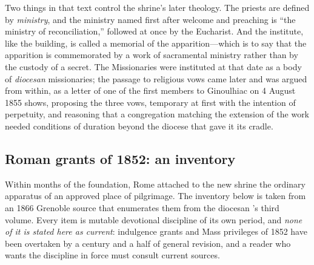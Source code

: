 Two things in that text control the shrine's later theology. The
priests are defined by \emph{ministry}, and the ministry named first
after welcome and preaching is ``the ministry of reconciliation,''
followed at once by the Eucharist. And the institute, like the
building, is called a memorial of the apparition---which is to say
that the apparition is commemorated by a work of sacramental
ministry rather than by the custody of a secret. The Missionaries
were instituted at that date as a body of \emph{diocesan}
missionaries; the passage to religious vows came later and was
argued from within, as a letter of one of the first members to
Ginoulhiac on 4 August 1855 shows, proposing the three vows,
temporary at first with the intention of perpetuity, and reasoning
that a congregation matching the extension of the work needed
conditions of duration beyond the diocese that gave it its
cradle.

\subsection{Roman grants of 1852: an inventory}

Within months of the foundation, Rome attached to the new shrine the
ordinary apparatus of an approved place of pilgrimage. The inventory
below is taken from an 1866 Grenoble source that enumerates them
from the diocesan 's third volume. Every item is
mutable devotional discipline of its own period, and \emph{none of
it is stated here as current}: indulgence grants and Mass privileges
of 1852 have been overtaken by a century and a half of general
revision, and a reader who wants the discipline in force must
consult current sources.

